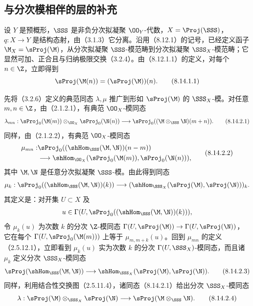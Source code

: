 \subsection{与分次模相伴的层的补充}

 设 $Y$ 是预概形，$\SSS$ 是非负分次拟凝聚 $\OO_Y$-代数，$X=\Proj(\SSS)$，$q:X\to Y$ 是结构态射，由（3.1.3）它分离。沿用（8.12.1）的记号，已经定义函子 $\M_X=\sProj(\M)$，从分次拟凝聚 $\SSS$-模范畴到分次拟凝聚 $\SSS_X$-模范畴；它显然可加、正合且与归纳极限交换（3.2.4）。由（8.12.1.1）的定义，对每个 $n\in\Z$，立即得到
\begin{equation}\sProj(\M(n))=(\sProj(\M))(n).\tag{8.14.1.1}\end{equation}

 先将（3.2.6）定义的典范同态 $\lambda,\mu$ 推广到形如 $\sProj(\M)$ 的 $\SSS_X$-模。对任意 $m,n\in\Z$，由（2.1.2.1），有典范 $\OO_X$-模同态
\begin{equation}\begin{aligned}
\lambda_{mn}:\sProj_0(\M(m))\otimes_{\OO_X}\sProj_0(\N(n))
\longrightarrow\sProj_0((\M\otimes_{\SSS}\N)(m+n)).
\end{aligned}\tag{8.14.2.1}\end{equation}
同样，由（2.1.2.2），有典范 $\OO_X$-模同态
\begin{equation}\begin{aligned}
\mu_{mn}:&\sProj_0((\shHom_{\SSS}(\M,\N))(n-m))\\
&\longrightarrow\shHom_{\OO_X}(\sProj_0(\M(m)),\sProj_0(\N(n))),
\end{aligned}\tag{8.14.2.2}\end{equation}
其中 $\M,\N$ 是任意分次拟凝聚 $\SSS$-模。由此得到同态
\[\mu_k:\sProj_0((\shHom_{\SSS}(\M,\N))(k))
\longrightarrow(\shHom_{\SSS_X}(\sProj(\M),\sProj(\N)))_k.\]
其定义是：对开集 $U\subset X$ 及
\[u\in\Gamma(U,\sProj_0((\shHom_{\SSS}(\M,\N))(k))),\]
令 $\mu_k(u)$ 为次数 $k$ 的分次 $\Z$-模同态 $\Gamma(U,\sProj(\M))\to\Gamma(U,\sProj(\N))$，它在每个 $\Gamma(U,\sProj_0(\M(m)))$ 上等于 $\mu_{m,m+k}(u)$。回到 $\mu_{mn}$ 的定义（2.5.12.1），立即看到 $\mu_k(u)$ 实为次数 $k$ 的分次 $\Gamma(U,\SSS_X)$-模同态，而且诸 $\mu_k$ 定义分次 $\SSS_X$-模同态
\begin{equation}\sProj(\shHom_{\SSS}(\M,\N))\longrightarrow
\shHom_{\SSS_X}(\sProj(\M),\sProj(\N)).\tag{8.14.2.3}\end{equation}
同样，利用结合性交换图（2.5.11.4），诸同态（8.14.2.1）给出分次 $\SSS_X$-模同态
\begin{equation}\lambda:\sProj(\M)\otimes_{\SSS_X}\sProj(\N)
\longrightarrow\sProj(\M\otimes_{\SSS}\N).\tag{8.14.2.4}\end{equation}

